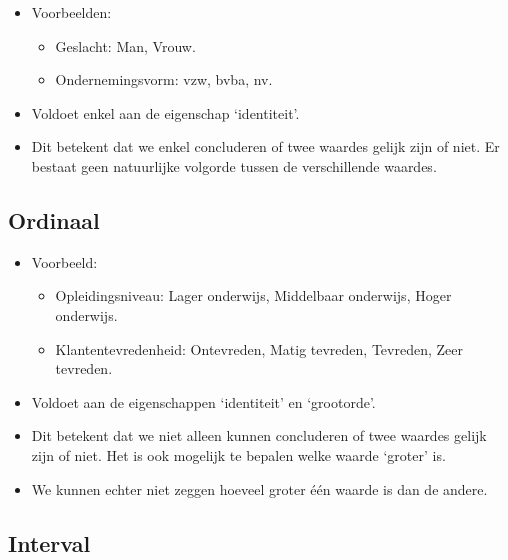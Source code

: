 \documentclass[]{memoir}
\providecommand{\tightlist}{%
  \setlength{\itemsep}{0pt}\setlength{\parskip}{0pt}}
\begin{document}
\begin{itemize}
\tightlist
\item
  Voorbeelden:

  \begin{itemize}
  \tightlist
  \item
    Geslacht: Man, Vrouw.
  \item
    Ondernemingsvorm: vzw, bvba, nv.
  \end{itemize}
\item
  Voldoet enkel aan de eigenschap `identiteit'.
\item
  Dit betekent dat we enkel concluderen of twee waardes gelijk zijn of
  niet. Er bestaat geen natuurlijke volgorde tussen de verschillende
  waardes.
\end{itemize}

\subsection*{Ordinaal}\label{ordinaal}

\begin{itemize}
\tightlist
\item
  Voorbeeld:

  \begin{itemize}
  \tightlist
  \item
    Opleidingsniveau: Lager onderwijs, Middelbaar onderwijs, Hoger
    onderwijs.
  \item
    Klantentevredenheid: Ontevreden, Matig tevreden, Tevreden, Zeer
    tevreden.
  \end{itemize}
\item
  Voldoet aan de eigenschappen `identiteit' en `grootorde'.
\item
  Dit betekent dat we niet alleen kunnen concluderen of twee waardes
  gelijk zijn of niet. Het is ook mogelijk te bepalen welke waarde
  `groter' is.
\item
  We kunnen echter niet zeggen hoeveel groter één waarde is dan de
  andere.
\end{itemize}

\subsection*{Interval}\label{interval}
\end{document}

